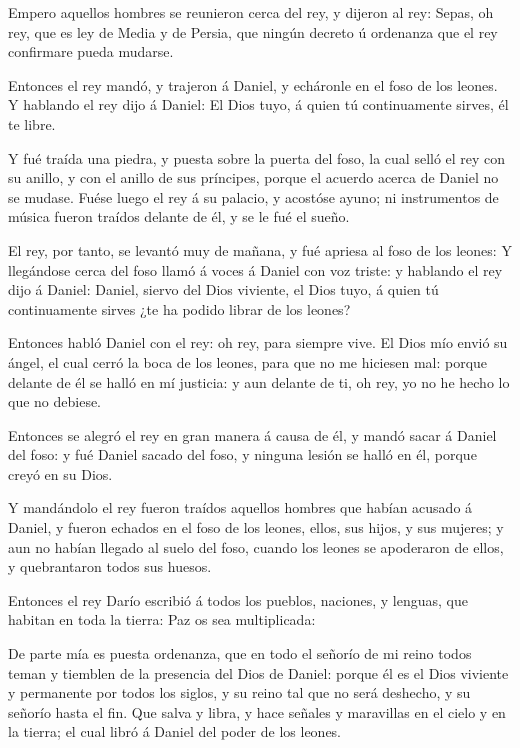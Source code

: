  Empero aquellos hombres se reunieron cerca del rey, y
dijeron al rey: Sepas, oh rey, que es ley de Media y de Persia, que
ningún decreto ú ordenanza que el rey confirmare pueda mudarse.

 Entonces el rey mandó, y trajeron á Daniel, y echáronle en
el foso de los leones. Y hablando el rey dijo á Daniel: El Dios tuyo, á
quien tú continuamente sirves, él te libre.

 Y fué traída una piedra, y puesta sobre la puerta del
foso, la cual selló el rey con su anillo, y con el anillo de sus
príncipes, porque el acuerdo acerca de Daniel no se mudase.
 Fuése luego el rey á su palacio, y acostóse ayuno; ni
instrumentos de música fueron traídos delante de él, y se le fué el
sueño.

 El rey, por tanto, se levantó muy de mañana, y fué apriesa
al foso de los leones:  Y llegándose cerca del foso llamó á
voces á Daniel con voz triste: y hablando el rey dijo á Daniel: Daniel,
siervo del Dios viviente, el Dios tuyo, á quien tú continuamente sirves
¿te ha podido librar de los leones?

 Entonces habló Daniel con el rey: oh rey, para siempre
vive.  El Dios mío envió su ángel, el cual cerró la boca de
los leones, para que no me hiciesen mal: porque delante de él se halló
en mí justicia: y aun delante de ti, oh rey, yo no he hecho lo que no
debiese.

 Entonces se alegró el rey en gran manera á causa de él, y
mandó sacar á Daniel del foso: y fué Daniel sacado del foso, y ninguna
lesión se halló en él, porque creyó en su Dios.

 Y mandándolo el rey fueron traídos aquellos hombres que
habían acusado á Daniel, y fueron echados en el foso de los leones,
ellos, sus hijos, y sus mujeres; y aun no habían llegado al suelo del
foso, cuando los leones se apoderaron de ellos, y quebrantaron todos sus
huesos.

 Entonces el rey Darío escribió á todos los pueblos,
naciones, y lenguas, que habitan en toda la tierra: Paz os sea
multiplicada:

 De parte mía es puesta ordenanza, que en todo el señorío
de mi reino todos teman y tiemblen de la presencia del Dios de Daniel:
porque él es el Dios viviente y permanente por todos los siglos, y su
reino tal que no será deshecho, y su señorío hasta el fin. 
Que salva y libra, y hace señales y maravillas en el cielo y en la
tierra; el cual libró á Daniel del poder de los leones.

